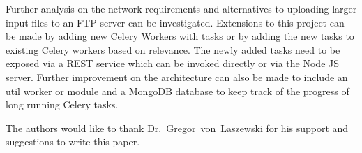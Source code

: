 Further analysis on the network requirements and alternatives to uploading 
larger input files to an FTP server can be investigated. Extensions to this 
project can be made by adding new Celery Workers with tasks or by adding 
the new tasks to existing Celery workers based on relevance. The newly added 
tasks need to be exposed via a REST service which can be invoked directly or 
via the Node JS server. Further improvement on the architecture can also be 
made to include an util worker or module and a MongoDB database to keep track 
of the progress of long running Celery tasks.

\begin{acks}

  The authors would like to thank Dr.~Gregor~von~Laszewski for his
  support and suggestions to write this paper.

\end{acks}


 

